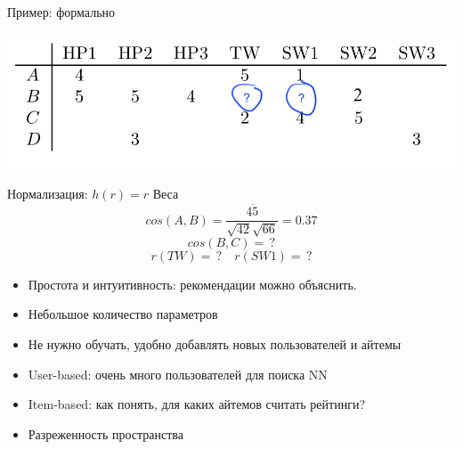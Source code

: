 \documentclass[11pt,aspectratio=169,handout]{beamer}
\begin{document}
\begin{frame}{Пример: формально}

\begin{center}
\includegraphics[scale=0.5]{images/utility.png}
\end{center}

Нормализация: $h(r) = r$
Веса
\[
cos(A, B) = \frac{4 \dot 5}{ \sqrt{42} \sqrt{66} } = 0.37
\]
\[
cos(B, C) = \, ? 
\]
\[
r(TW) = \, ? \quad r(SW1) = \, ?
\]

\end{frame}

\begin{frame}{}

\begin{tcolorbox}[colback=info!5,colframe=info!80,title=Плюсы]
  \begin{itemize}
    \item Простота и интуитивность: рекомендации можно объяснить.
    \item Небольшое количество параметров
    \item Не нужно обучать, удобно добавлять новых пользователей и айтемы
  \end{itemize}
\end{tcolorbox}

\begin{tcolorbox}[colback=warn!5,colframe=warn!80,title=Минусы]
  \begin{itemize}
    \item User-based: очень много пользователей для поиска NN
    \item Item-based: как понять, для каких айтемов считать рейтинги?
    \item Разреженность пространства
  \end{itemize}
\end{tcolorbox}

\end{frame}
\end{document}

